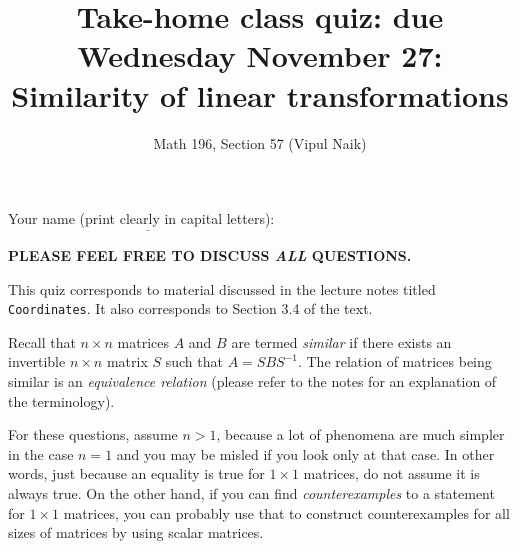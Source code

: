 \documentclass[10pt]{amsart}
\title{Take-home class quiz: due Wednesday November 27: Similarity of linear transformations}
\author{Math 196, Section 57 (Vipul Naik)}
\begin{document}
\maketitle

Your name (print clearly in capital letters): $\underline{\qquad\qquad\qquad\qquad\qquad\qquad\qquad\qquad\qquad\qquad}$

{\bf PLEASE FEEL FREE TO DISCUSS {\em ALL} QUESTIONS.}

This quiz corresponds to material discussed in the lecture notes
titled {\tt Coordinates}. It also corresponds to Section 3.4 of the
text.

Recall that $n \times n$ matrices $A$ and $B$ are termed {\em similar}
if there exists an invertible $n \times n$ matrix $S$ such that $A =
SBS^{-1}$. The relation of matrices being similar is an {\em
  equivalence relation} (please refer to the notes for an explanation
of the terminology).

For these questions, assume $n > 1$, because a lot of phenomena are
much simpler in the case $n = 1$ and you may be misled if you look
only at that case. In other words, just because an equality is true
for $1 \times 1$ matrices, do not assume it is always true. On the
other hand, if you can find {\em counterexamples} to a statement for
$1 \times 1$ matrices, you can probably use that to construct
counterexamples for all sizes of matrices by using scalar matrices.
\end{document}
